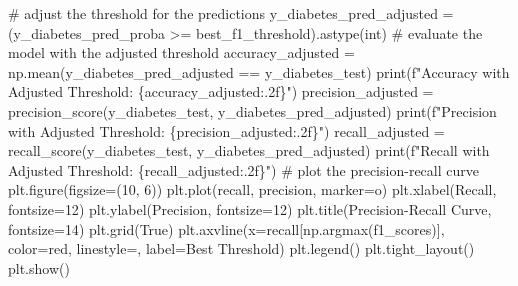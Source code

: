 \documentclass[
  letterpaper,
  DIV=11,
  numbers=noendperiod]{scrreprt}
\newenvironment{Shaded}{\begin{snugshade}}{\end{snugshade}}
\newcommand{\BuiltInTok}[1]{\textcolor[rgb]{0.00,0.23,0.31}{#1}}
\newcommand{\CommentTok}[1]{\textcolor[rgb]{0.37,0.37,0.37}{#1}}
\newcommand{\DecValTok}[1]{\textcolor[rgb]{0.68,0.00,0.00}{#1}}
\newcommand{\NormalTok}[1]{\textcolor[rgb]{0.00,0.23,0.31}{#1}}
\newcommand{\OperatorTok}[1]{\textcolor[rgb]{0.37,0.37,0.37}{#1}}
\newcommand{\SpecialCharTok}[1]{\textcolor[rgb]{0.37,0.37,0.37}{#1}}
\newcommand{\SpecialStringTok}[1]{\textcolor[rgb]{0.13,0.47,0.30}{#1}}
\newcommand{\StringTok}[1]{\textcolor[rgb]{0.13,0.47,0.30}{#1}}
\newcommand{\VariableTok}[1]{\textcolor[rgb]{0.07,0.07,0.07}{#1}}
\begin{document}
\begin{Shaded}
\begin{Highlighting}[]
\CommentTok{\# adjust the threshold for the predictions}
\NormalTok{y\_diabetes\_pred\_adjusted }\OperatorTok{=}\NormalTok{ (y\_diabetes\_pred\_proba }\OperatorTok{\textgreater{}=}\NormalTok{ best\_f1\_threshold).astype(}\BuiltInTok{int}\NormalTok{)}
\CommentTok{\# evaluate the model with the adjusted threshold}
\NormalTok{accuracy\_adjusted }\OperatorTok{=}\NormalTok{ np.mean(y\_diabetes\_pred\_adjusted }\OperatorTok{==}\NormalTok{ y\_diabetes\_test)}
\BuiltInTok{print}\NormalTok{(}\SpecialStringTok{f"Accuracy with Adjusted Threshold: }\SpecialCharTok{\{}\NormalTok{accuracy\_adjusted}\SpecialCharTok{:.2f\}}\SpecialStringTok{"}\NormalTok{)}
\NormalTok{precision\_adjusted }\OperatorTok{=}\NormalTok{ precision\_score(y\_diabetes\_test, y\_diabetes\_pred\_adjusted)}
\BuiltInTok{print}\NormalTok{(}\SpecialStringTok{f"Precision with Adjusted Threshold: }\SpecialCharTok{\{}\NormalTok{precision\_adjusted}\SpecialCharTok{:.2f\}}\SpecialStringTok{"}\NormalTok{)}
\NormalTok{recall\_adjusted }\OperatorTok{=}\NormalTok{ recall\_score(y\_diabetes\_test, y\_diabetes\_pred\_adjusted)}
\BuiltInTok{print}\NormalTok{(}\SpecialStringTok{f"Recall with Adjusted Threshold: }\SpecialCharTok{\{}\NormalTok{recall\_adjusted}\SpecialCharTok{:.2f\}}\SpecialStringTok{"}\NormalTok{)}
\CommentTok{\# plot the precision{-}recall curve}
\NormalTok{plt.figure(figsize}\OperatorTok{=}\NormalTok{(}\DecValTok{10}\NormalTok{, }\DecValTok{6}\NormalTok{))}
\NormalTok{plt.plot(recall, precision, marker}\OperatorTok{=}\StringTok{\textquotesingle{}o\textquotesingle{}}\NormalTok{)}
\NormalTok{plt.xlabel(}\StringTok{\textquotesingle{}Recall\textquotesingle{}}\NormalTok{, fontsize}\OperatorTok{=}\DecValTok{12}\NormalTok{)}
\NormalTok{plt.ylabel(}\StringTok{\textquotesingle{}Precision\textquotesingle{}}\NormalTok{, fontsize}\OperatorTok{=}\DecValTok{12}\NormalTok{)}
\NormalTok{plt.title(}\StringTok{\textquotesingle{}Precision{-}Recall Curve\textquotesingle{}}\NormalTok{, fontsize}\OperatorTok{=}\DecValTok{14}\NormalTok{)}
\NormalTok{plt.grid(}\VariableTok{True}\NormalTok{)}
\NormalTok{plt.axvline(x}\OperatorTok{=}\NormalTok{recall[np.argmax(f1\_scores)], color}\OperatorTok{=}\StringTok{\textquotesingle{}red\textquotesingle{}}\NormalTok{, linestyle}\OperatorTok{=}\StringTok{\textquotesingle{}{-}{-}\textquotesingle{}}\NormalTok{, label}\OperatorTok{=}\StringTok{\textquotesingle{}Best Threshold\textquotesingle{}}\NormalTok{)}
\NormalTok{plt.legend()}
\NormalTok{plt.tight\_layout()}
\NormalTok{plt.show()}
\end{Highlighting}
\end{Shaded}
\end{document}
